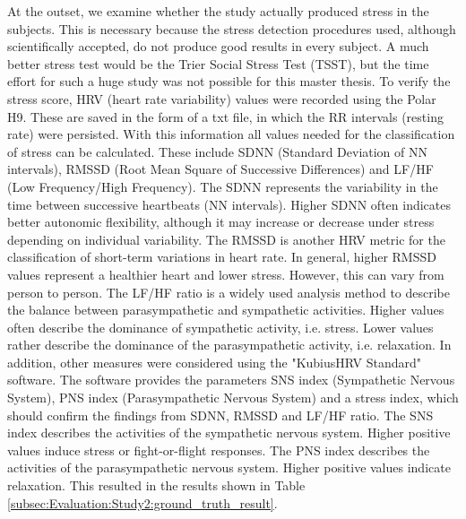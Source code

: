 At the outset, we examine whether the study actually produced stress in the subjects. 
This is necessary because the stress detection procedures used, although scientifically accepted, do not produce good results in every subject. 
A much better stress test would be the Trier Social Stress Test (TSST), but the time effort for such a huge study was not possible for this master thesis. 
To verify the stress score, HRV (heart rate variability) values were recorded using the Polar H9.
These are saved in the form of a txt file, in which the RR intervals (resting rate) were persisted.
With this information all values needed for the classification of stress can be calculated.
These include SDNN (Standard Deviation of NN intervals), RMSSD (Root Mean Square of Successive Differences) and LF/HF (Low Frequency/High Frequency).
The SDNN represents the variability in the time between successive heartbeats (NN intervals). 
Higher SDNN often indicates better autonomic flexibility, although it may increase or decrease under stress depending on individual variability.
The RMSSD is another HRV metric for the classification of short-term variations in heart rate.
In general, higher RMSSD values represent a healthier heart and lower stress.
However, this can vary from person to person.
The LF/HF ratio is a widely used analysis method to describe the balance between parasympathetic and sympathetic activities. 
Higher values often describe the dominance of sympathetic activity, i.e. stress. 
Lower values rather describe the dominance of the parasympathetic activity, i.e. relaxation.
In addition, other measures were considered using the "KubiusHRV Standard" software.
The software provides the parameters SNS index (Sympathetic Nervous System), PNS index (Parasympathetic Nervous System) and a stress index, which should confirm the findings from SDNN, RMSSD and LF/HF ratio.
The SNS index describes the activities of the sympathetic nervous system. 
Higher positive values induce stress or fight-or-flight responses.
The PNS index describes the activities of the parasympathetic nervous system. 
Higher positive values indicate relaxation.
This resulted in the results shown in Table \ref{subsec:Evaluation:Study2:ground_truth_result}. 

